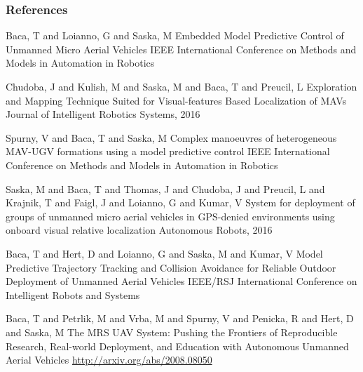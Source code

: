 \documentclass[aspectratio=1610]{beamer}
\begin{document}
  \begin{frame}
    \frametitle{References}
    \tiny{
      \begin{thebibliography}{99}

         Baca, T and Loianno, G and Saska, M
          \newblock Embedded Model Predictive Control of Unmanned Micro Aerial Vehicles
           IEEE International Conference on Methods and Models in Automation in Robotics

         Chudoba, J and Kulish, M and Saska, M and Baca, T and Preucil, L
          \newblock Exploration and Mapping Technique Suited for Visual-features Based Localization of MAVs
          \newblock Journal of Intelligent Robotics Systems, 2016


         Spurny, V and Baca, T and Saska, M
          \newblock Complex manoeuvres of heterogeneous MAV-UGV formations using a model predictive control
           IEEE International Conference on Methods and Models in Automation in Robotics

         Saska, M and Baca, T and Thomas, J and Chudoba, J and Preucil, L and Krajnik, T and Faigl, J and Loianno, G and Kumar, V
          \newblock System for deployment of groups of unmanned micro aerial vehicles in GPS-denied environments using onboard visual relative localization
          \newblock Autonomous Robots, 2016

         Baca, T and Hert, D and Loianno, G and Saska, M and Kumar, V
          \newblock Model Predictive Trajectory Tracking and Collision Avoidance for Reliable Outdoor Deployment of Unmanned Aerial Vehicles
           IEEE/RSJ International Conference on Intelligent Robots and Systems

         Baca, T and Petrlik, M and Vrba, M and Spurny, V and Penicka, R and Hert, D and Saska, M
          \newblock The MRS UAV System: Pushing the Frontiers of Reproducible Research, Real-world Deployment, and Education with Autonomous Unmanned Aerial Vehicles
          \newblock \url{http://arxiv.org/abs/2008.08050}


      \end{thebibliography}
    }
  \end{frame}

\end{document}
